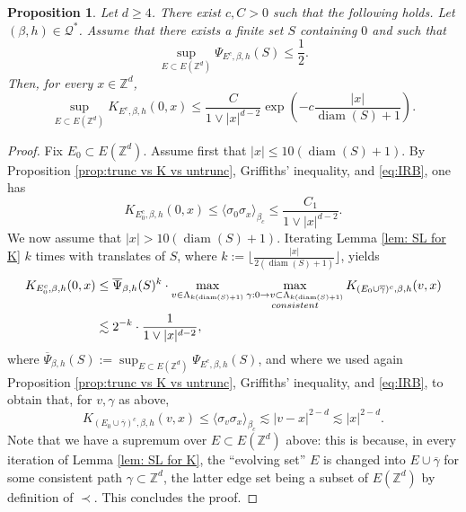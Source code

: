 \documentclass[10pt,a4paper]{amsart}
\numberwithin{equation}{section}
\newtheorem{Prop}[Thm]{Proposition}
\begin{document}
\begin{Prop}\label{prop:sufficient condition to exp decay} Let $d\geq 4$. There exist $c,C>0$ such that the following holds. Let $(\beta,h)\in \mathcal Q^*$. Assume that there exists a finite set $S$ containing $0$ and such that
\begin{equation}\label{eq: assumption to get exp decay}
	\sup_{E\subset E(\mathbb Z^d)}\Psi_{E^c,\beta,h}(S)\leq \frac{1}{2}.
\end{equation}
Then, for every $x\in \mathbb Z^d$,
\begin{equation}
	\sup_{E\subset E(\mathbb Z^d)}K_{E^c,\beta,h}(0,x)\leq \frac{C}{1\vee |x|^{d-2}}\exp\left(-c\frac{|x|}{\operatorname{diam}(S)+1}\right).
\end{equation}
\end{Prop}
\begin{proof} Fix $E_0\subset E(\mathbb Z^d)$. Assume first that $|x|\leq 10(\operatorname{diam}(S)+1)$. By Proposition \ref{prop:trunc vs K vs untrunc}, Griffiths' inequality, and \eqref{eq:IRB}, one has \begin{equation}\label{eq:pf suff 1}
	K_{E_0^c,\beta,h}(0,x)\leq  \langle \sigma_0\sigma_x\rangle_{\beta_c}\leq \frac{C_1}{1\vee |x|^{d-2}}.
\end{equation}
We now assume that $|x|>10(\operatorname{diam}(S)+1)$. Iterating Lemma \ref{lem: SL for K} $k$ times with translates of $S$, where $k:=\lfloor\tfrac{|x|}{2(\operatorname{diam}(S)+1)}\rfloor$, yields
\begin{align}	
\begin{aligned}
	K_{E_0^c,\beta,h}(0,x)&\leq \overline{\Psi}_{\beta,h}(S)^k\cdot \max_{v\in \Lambda_{k(\operatorname{diam}(S)+1)}}\max_{\substack{\gamma:0\rightarrow v\subset \Lambda_{k(\operatorname{diam}(S)+1)} \\\textup{consistent}}}K_{(E_0\cup\overline{\gamma})^c,\beta,h}(v,x)\\&\lesssim 2^{-k}\cdot  \frac{1}{1\vee |x|^{d-2}},
\end{aligned}
\end{align}
where $\overline{\Psi}_{\beta,h}(S):=\sup_{E\subset E(\mathbb Z^d)}\Psi_{E^c,\beta,h}(S)$, and
where we used again Proposition \ref{prop:trunc vs K vs untrunc}, Griffiths' inequality, and \eqref{eq:IRB}, to obtain that, for $v,\gamma$ as above, 
\begin{equation}
K_{(E_0\cup\overline{\gamma})^c,\beta,h}(v,x)\leq \langle \sigma_v\sigma_x\rangle_{\beta_c}\lesssim |v-x|^{2-d}\lesssim |x|^{2-d}.
\end{equation} 
Note that we have a supremum over $E\subset E(\mathbb Z^d)$ above: this is because, in every iteration of Lemma \ref{lem: SL for K}, the ``evolving set'' $E$ is changed into $E\cup \overline{\gamma}$ for some consistent path $\gamma\subset \mathbb Z^d$, the latter edge set being a subset of $E(\mathbb Z^d)$ by definition of $\prec$. This concludes the proof.
\end{proof}
\end{document}
